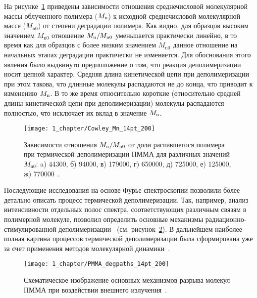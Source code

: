 На рисунке~\ref{fig:Cowley_Mn} приведены зависимости отношения среднечисловой молекулярной массы облученного полимера ($M_\mathrm{n}$) к исходной среднечисловой молекулярной массе ($M_\mathrm{n0}$) от степени деградации полимера. Как видно, для образцов высоким значением $M_\mathrm{n0}$ отношение $M_\mathrm{n} / M_\mathrm{n0}$ уменьшается практически линейно, в то время как для образцов с более низким значением $M_\mathrm{n0}$ данное отношение на начальных этапах деградации практически не изменяется. Для обоснования этого явления было выдвинуто предположение о том, что реакция деполимеризации носит цепной характер. Средняя длина кинетической цепи при деполимеризации при этом такова, что длинные молекулы распадаются не до конца, что приводит к изменению $M_\mathrm{n}$. В то же время относительно короткие (относительно средней длины кинетической цепи при деполимеризации) молекулы распадаются полностью, что исключает их вклад в значение $M_\mathrm{n}$.

\begin{figure}[t]
	\centering
	\texttt{[image: 1\_chapter/Cowley\_Mn\_14pt\_200]}
	\vspace{0.5em}
	\caption{Зависимости отношения $M_\mathrm{n} / M_\mathrm{n0}$ от доли распавшегося полимера при термической деполимеризации ПММА для различных значений $M_\mathrm{n0}$: a) 44300, б) 94000, в) 179000, г) 650000, д) 725000, е) 125000, ж) 770000~\cite{Cowley_1952_1}.}
	\label{fig:Cowley_Mn}
\end{figure}

Последующие исследования на основе Фурье-спектроскопии позволили более детально описать процесс термической деполимеризации. Так, например, анализ интенсивности отдельных полос спектра, соответствующих различным связям в полимерной молекуле, позволил определить основные механизмы радиационно-стимулированной деполимеризации~\cite{Bermudez} (см. рисунок~\ref{fig:PMMA_degpaths}). В дальнейшем наиболее полная картина процессов термической деполимеризации была сформирована уже за счет применения методов молекулярной динамики~\cite{Stoliarov}.

\begin{figure}[t]
	\centering
	\texttt{[image: 1\_chapter/PMMA\_degpaths\_14pt\_200]}
	\caption{Схематическое изображение основных механизмов разрыва молекул ПММА при воздействии внешнего излучения~\cite{Bermudez}.}
	\label{fig:PMMA_degpaths}
\end{figure}

